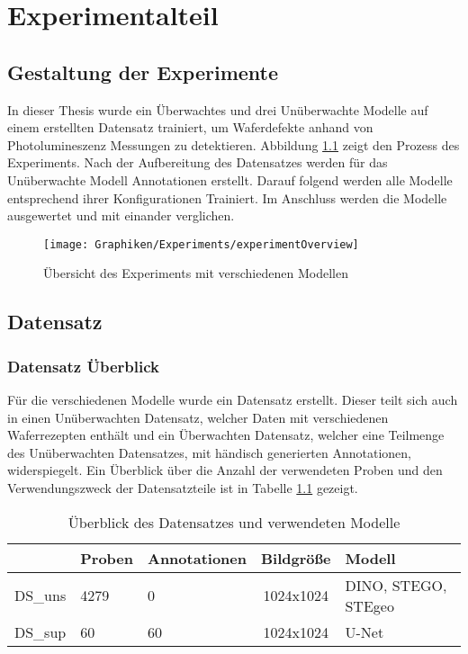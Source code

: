 
\clearpage

\chapter{Experimentalteil}
\label{chap:experiments}

\section{Gestaltung der Experimente}


In dieser Thesis wurde ein Überwachtes und drei Unüberwachte Modelle auf einem erstellten Datensatz trainiert, um Waferdefekte anhand von Photolumineszenz Messungen zu detektieren. Abbildung \ref{fig:experimentoverview} zeigt den Prozess des Experiments. Nach der Aufbereitung des Datensatzes werden für das Unüberwachte Modell Annotationen erstellt. Darauf folgend werden alle Modelle entsprechend ihrer Konfigurationen Trainiert. Im Anschluss werden die Modelle ausgewertet und mit einander verglichen. 
  

\begin{figure}[h!]
	\centering
	\texttt{[image: Graphiken/Experiments/experimentOverview]}
	\caption{Übersicht des Experiments mit verschiedenen Modellen}
	\label{fig:experimentoverview}
\end{figure}




\section{Datensatz}  

\subsection{Datensatz Überblick}

Für die verschiedenen Modelle wurde ein Datensatz erstellt. Dieser teilt sich auch in einen Unüberwachten Datensatz, welcher Daten mit verschiedenen Waferrezepten enthält und ein Überwachten Datensatz, welcher eine Teilmenge des Unüberwachten Datensatzes, mit händisch generierten Annotationen, widerspiegelt. Ein Überblick über die Anzahl der verwendeten Proben und den Verwendungszweck der Datensatzteile ist in Tabelle \ref{tab:ds_overview} gezeigt.


\begin{table}[]
	\centering
	\begin{tabular}{@{}lllcl@{}}
		\toprule
				& \textbf{Proben} & \textbf{Annotationen} & \textbf{Bildgröße} & \textbf{Modell} \\ \midrule
		DS\_uns & 4279   & 0            & 1024x1024 & DINO, STEGO, STEgeo \\
		DS\_sup & 60     & 60           & 1024x1024 & U-Net \\ \bottomrule
	\end{tabular}
	\caption{Überblick des Datensatzes und verwendeten Modelle}
	\label{tab:ds_overview}
\end{table}

